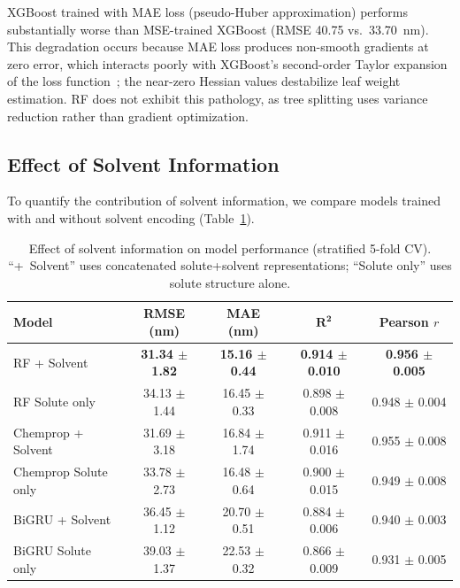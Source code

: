 \documentclass[journal=jcisd8,manuscript=article]{achemso}
\begin{document}
XGBoost trained with MAE loss (pseudo-Huber approximation) performs substantially worse than MSE-trained XGBoost (RMSE 40.75 vs.\ 33.70~nm).
This degradation occurs because MAE loss produces non-smooth gradients at zero error, which interacts poorly with XGBoost's second-order Taylor expansion of the loss function~\cite{chen2016xgboost}; the near-zero Hessian values destabilize leaf weight estimation.
RF does not exhibit this pathology, as tree splitting uses variance reduction rather than gradient optimization.


\subsection{Effect of Solvent Information}
\label{sec:solvent_ablation}

To quantify the contribution of solvent information, we compare models trained with and without solvent encoding (Table~\ref{tab:solvent_ablation}).

\begin{table}[htbp]
\centering
\caption{Effect of solvent information on model performance (stratified 5-fold CV). ``+~Solvent'' uses concatenated solute+solvent representations; ``Solute only'' uses solute structure alone.}
\label{tab:solvent_ablation}
\begin{tabular}{lcccc}
\toprule
\textbf{Model} & \textbf{RMSE (nm)} & \textbf{MAE (nm)} & $\boldsymbol{R^2}$ & \textbf{Pearson $r$} \\
\midrule
RF + Solvent          & \textbf{31.34 $\pm$ 1.82} & \textbf{15.16 $\pm$ 0.44} & \textbf{0.914 $\pm$ 0.010} & \textbf{0.956 $\pm$ 0.005} \\
RF Solute only        & 34.13 $\pm$ 1.44          & 16.45 $\pm$ 0.33          & 0.898 $\pm$ 0.008          & 0.948 $\pm$ 0.004 \\
\midrule
Chemprop + Solvent    & 31.69 $\pm$ 3.18          & 16.84 $\pm$ 1.74          & 0.911 $\pm$ 0.016          & 0.955 $\pm$ 0.008 \\
Chemprop Solute only  & 33.78 $\pm$ 2.73          & 16.48 $\pm$ 0.64          & 0.900 $\pm$ 0.015          & 0.949 $\pm$ 0.008 \\
\midrule
BiGRU + Solvent       & 36.45 $\pm$ 1.12          & 20.70 $\pm$ 0.51          & 0.884 $\pm$ 0.006          & 0.940 $\pm$ 0.003 \\
BiGRU Solute only     & 39.03 $\pm$ 1.37          & 22.53 $\pm$ 0.32          & 0.866 $\pm$ 0.009          & 0.931 $\pm$ 0.005 \\
\bottomrule
\end{tabular}
\end{table}
\end{document}
